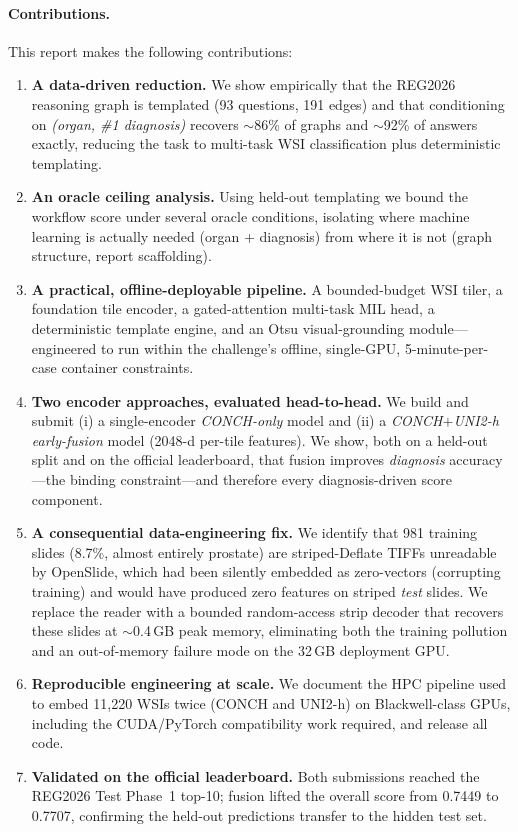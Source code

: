 \documentclass[11pt,a4paper]{article}
\begin{document}
\paragraph{Contributions.} This report makes the following contributions:
\begin{enumerate}[leftmargin=1.4em,itemsep=2pt]
  \item \textbf{A data-driven reduction.} We show empirically that the REG2026 reasoning graph
        is templated (93 questions, 191 edges) and that conditioning on \emph{(organ, \#1
        diagnosis)} recovers $\sim$86\% of graphs and $\sim$92\% of answers exactly, reducing
        the task to multi-task WSI classification plus deterministic templating.
  \item \textbf{An oracle ceiling analysis.} Using held-out templating we bound the workflow
        score under several oracle conditions, isolating where machine learning is actually
        needed (organ + diagnosis) from where it is not (graph structure, report scaffolding).
  \item \textbf{A practical, offline-deployable pipeline.} A bounded-budget WSI tiler, a
        foundation tile encoder, a gated-attention multi-task MIL head, a deterministic template
        engine, and an Otsu visual-grounding module---engineered to run within the challenge's
        offline, single-GPU, 5-minute-per-case container constraints.
  \item \textbf{Two encoder approaches, evaluated head-to-head.} We build and submit (i) a
        single-encoder \emph{CONCH-only} model and (ii) a \emph{CONCH$+$UNI2-h early-fusion} model
        (2048-d per-tile features). We show, both on a held-out split and on the official
        leaderboard, that fusion improves \emph{diagnosis} accuracy---the binding constraint---and
        therefore every diagnosis-driven score component.
  \item \textbf{A consequential data-engineering fix.} We identify that 981 training slides
        (8.7\%, almost entirely prostate) are striped-Deflate TIFFs unreadable by OpenSlide, which
        had been silently embedded as zero-vectors (corrupting training) and would have produced
        zero features on striped \emph{test} slides. We replace the reader with a bounded
        random-access strip decoder that recovers these slides at $\sim$0.4\,GB peak memory,
        eliminating both the training pollution and an out-of-memory failure mode on the
        32\,GB deployment GPU.
  \item \textbf{Reproducible engineering at scale.} We document the HPC pipeline used to embed
        11{,}220 WSIs twice (CONCH and UNI2-h) on Blackwell-class GPUs, including the CUDA/PyTorch
        compatibility work required, and release all code.
  \item \textbf{Validated on the official leaderboard.} Both submissions reached the REG2026 Test
        Phase~1 top-10; fusion lifted the overall score from 0.7449 to 0.7707, confirming the
        held-out predictions transfer to the hidden test set.
\end{enumerate}
\end{document}
